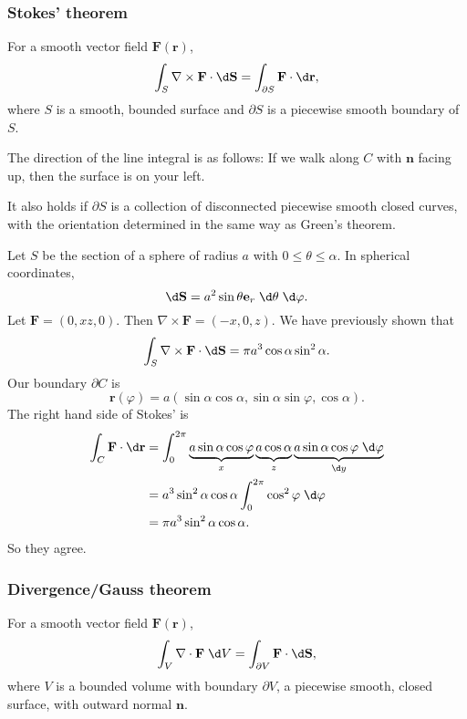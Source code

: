 \documentclass[a4paper]{article}
\begin{document}
\subsubsection{Stokes' theorem}
\begin{thm}
  For a smooth vector field $\mathbf{F}(\mathbf{r})$,
  \[
    \int_S \nabla\times \mathbf{F}\cdot \d \mathbf{S} = \int_{\partial S} \mathbf{F}\cdot \d \mathbf{r},
  \]
  where $S$ is a smooth, bounded surface and $\partial S$ is a piecewise smooth boundary of $S$.

  The direction of the line integral is as follows: If we walk along $C$ with $\mathbf{n}$ facing up, then the surface is on your left.
\end{thm}
It also holds if $\partial S$ is a collection of disconnected piecewise smooth closed curves, with the orientation determined in the same way as Green's theorem.

\begin{eg}
  Let $S$ be the section of a sphere of radius $a$ with $0 \leq \theta \leq \alpha$. In spherical coordinates,
  \[
    \d \mathbf{S} = a^2 \sin \theta \mathbf{e}_r \;\d \theta\;\d \varphi.
  \]
  Let $\mathbf{F} = (0, xz, 0)$. Then $\nabla \times \mathbf{F} = (-x, 0, z)$. We have previously shown that
  \[
    \int_S \nabla\times \mathbf{F}\cdot \d \mathbf{S} = \pi a^3 \cos\alpha\sin^2 \alpha.
  \]
  Our boundary $\partial C$ is
  \[
    \mathbf{r}(\varphi) = a(\sin \alpha\cos \alpha, \sin \alpha\sin \varphi, \cos \alpha).
  \]
  The right hand side of Stokes' is
  \begin{align*}
    \int_C \mathbf{F}\cdot \d \mathbf{r}  &= \int_0^{2\pi}\underbrace{a\sin \alpha\cos \varphi}_{x}\underbrace{\vphantom{\varphi}a\cos\alpha}_z \underbrace{a\sin \alpha\cos\varphi\;\d \varphi}_{\d y}\\
    &= a^3\sin^2\alpha\cos\alpha\int_0^{2\pi}\cos^2\varphi\;\d \varphi\\
    &= \pi a^3\sin^2\alpha\cos\alpha.
  \end{align*}
  So they agree.
\end{eg}

\subsubsection{Divergence/Gauss theorem}
\begin{thm}
  For a smooth vector field $\mathbf{F}(\mathbf{r})$,
  \[
    \int _V \nabla\cdot \mathbf{F}\;\d V = \int_{\partial V}\mathbf{F}\cdot \d \mathbf{S},
  \]
  where $V$ is a bounded volume with boundary $\partial V$, a piecewise smooth, closed surface, with outward normal $\mathbf{n}$.
\end{thm}
\end{document}
